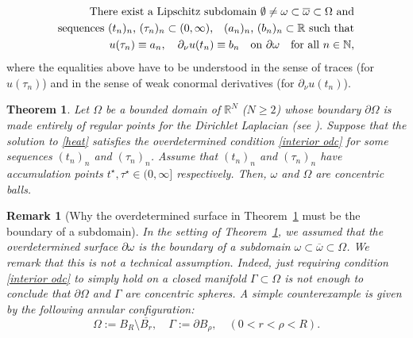 \documentclass[a4paper,11pt]{article}
\newtheorem{mainthm}{Theorem}
\newtheorem{remark}[theorem]{Remark}
\numberwithin{equation}{section}
\begin{document}
\begin{equation}\label{interior odc}
\begin{aligned}
\text{There exist a Lipschitz subdomain $\emptyset\ne\omega\subset \overline{\omega}\subset \Omega$ and}\\ \text{sequences $(t_n)_{n}$, $(\tau_n)_n\subset (0,\infty)$,\quad  $(a_n)_n$,  $(b_n)_{n}\subset\mathbb{R}$ such that}\\
u(\tau_n)\equiv a_n,\quad \partial_\nu u(t_n) \equiv b_n \quad \text{on }\partial\omega \quad \text{for all }n\in\mathbb{N},
\end{aligned}
\end{equation}
where the equalities above have to be understood in the sense of traces (for $u(\tau_n)$) and in the sense of weak conormal derivatives (for $\partial_\nu u(t_n)$). 

\begin{mainthm}\label{mainthm III}
Let $\Omega$ be a bounded domain of $\mathbb{R}^N$ ($N\ge 2$) whose boundary $\partial\Omega$ is made entirely of regular points for the Dirichlet Laplacian (see \cite[Chapter 8]{GilbargTrudinger}). Suppose that the solution to \eqref{heat} satisfies the overdetermined condition \eqref{interior odc} for some sequences $(t_n)_{n}$ and $(\tau_n)_n$. Assume that $(t_n)_n$ and $(\tau_n)_n$ have accumulation points $t^\star, \tau^\star\in (0,\infty]$ respectively. 
Then, $\omega$ and $\Omega$ are concentric balls.
\end{mainthm}

\begin{remark}[Why the overdetermined surface in Theorem~\ref{mainthm III} must be the boundary of a subdomain]
In the setting of Theorem~\ref{mainthm III}, we assumed that the \emph{overdetermined surface} $\partial\omega$ is the boundary of a subdomain $\omega\subset\overline{\omega}\subset\Omega$. We remark that this is not a technical assumption. Indeed, just requiring condition \eqref{interior odc} to simply hold on a closed manifold $\Gamma\subset \Omega$ is not enough to conclude that $\partial\Omega$ and $\Gamma$ are concentric spheres. A simple counterexample is given by the following annular  configuration:
\begin{equation*}
    \Omega:=B_R\setminus\overline{B_r}, \quad \Gamma:= \partial B_\rho, \quad (0<r<\rho<R).
\end{equation*}
\end{remark}
\medskip
\end{document}
